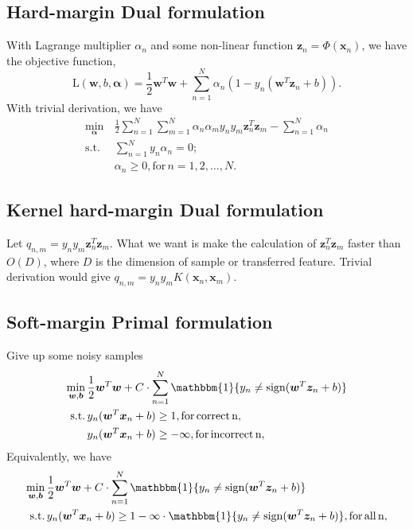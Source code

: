 \documentclass[11pt, a4paper, reqno, twoside]{scrartcl}
\theoremstyle{style}
\DeclareMathOperator*{\sign}{sign}
\newcommand{\0}{\mathbf{0}} %
\newcommand{\bw}{\bm{w}}
\newcommand{\bx}{\bm{x}}
\newcommand{\bb}{\bm{b}}
\newcommand{\balpha}{\bm{\alpha}}
\newcommand{\bz}{\bm{z}}
\begin{document}
\subsection{Hard-margin Dual formulation}
With Lagrange multiplier $\alpha_n$ and some non-linear function $\bz_n=\Phi(\bx_n)$, we have the objective function,
\begin{equation}
\mathrm{L}(\bw, b, \balpha) = \frac{1}{2} \bw^T \bw + \sum_{n=1}^N \alpha_n (1- y_n (\bw^T \bz_n +b )).
\end{equation}
With trivial derivation, we have
\begin{equation}
\begin{aligned}
\min_{\balpha} \, &\frac{1}{2} \sum_{n=1}^N \sum_{m=1}^N \alpha_n \alpha_m y_n y_m \bz_n^T \bz_m - \sum_{n=1}^N \alpha_n \\ 
\mathrm{s.t. }   \,                & \sum_{n=1}^N y_n \alpha_n =0; \\
									 & \alpha_n \geq 0,  \mathrm{for }\,  n=1, 2, \ldots, N. 
\end{aligned}
\end{equation}

\subsection{Kernel hard-margin Dual formulation}
Let $q_{n,m} = y_n y_m \bz_n^T \bz_m$. What we want is make the calculation of $\bz_n^T \bz_m$ faster than $O(D)$, where $D$ is the dimension of sample or transferred feature.
Trivial derivation would give $q_{n,m} = y_n y_m K(\bx_n, \bx_m)$. 

\subsection{Soft-margin Primal formulation}
Give up some noisy samples
\begin{equation}
\begin{aligned}
\min_{\bw,\bb} \, &\frac{1}{2} \bw^T \bw  + C \cdot \sum_{n=1}^N   \mathbbm{1}\{ y_n \neq \sign(\bw^T \bz_n + b) \} \\
\mathrm{s.t. }   \,                & y_n (\bw^T \bx_n + b) \geq 1, \mathrm{for }\,  \mathrm{correct \, n}, \\
										& y_n (\bw^T \bx_n + b) \geq -\infty, \mathrm{for }\,  \mathrm{incorrect\, n},
\end{aligned}
\end{equation}
Equivalently, we have
\begin{equation}
\begin{aligned}
\min_{\bw,\bb} \, &\frac{1}{2} \bw^T \bw  + C \cdot \sum_{n=1}^N   \mathbbm{1}\{ y_n \neq \sign(\bw^T \bz_n + b) \} \\
\mathrm{s.t. }   \,                & y_n (\bw^T \bx_n + b) \geq 1 -\infty \cdot  \mathbbm{1}\{ y_n \neq \sign(\bw^T \bz_n + b) \}, \mathrm{for }\,  \mathrm{all \, n}, 									
\end{aligned}
\end{equation}
\end{document}
